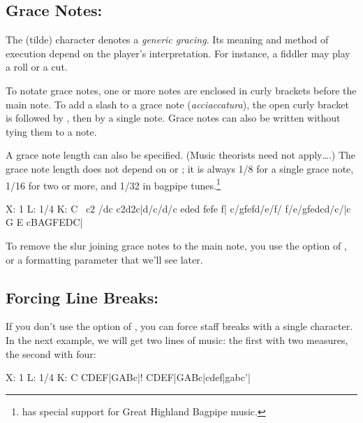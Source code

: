 \documentclass[a4paper,fullpage,12pt]{book}
\begin{document}

\subsection{Grace Notes: \icmd{\textasciitilde{} \{\}}}

The \car{\textasciitilde{}} (tilde) character denotes a \emph{generic
gracing}. Its meaning and method of execution depend on the player's
interpretation. For instance, a fiddler may play a roll or a cut.

To notate grace notes, one or more notes are enclosed in curly brackets
before the main note. To add a slash to a grace note
(\emph{acciaccatura}), the open curly bracket is followed by \car{/},
then by a single note. Grace notes can also be written without tying
them to a note.


A grace note length can also be specified. (Music theorists need not
apply{\ldots}.) The grace note length does not depend on  or
; it is always 1/8 for a single grace note, 1/16 for two or
more, and 1/32 in bagpipe tunes.\footnote{\abcm{} has special support
for Great Highland Bagpipe music.}


\begin{abcsource}
X: 1
L: 1/4
K: C
~c2 {/d}c {c2d2}c|{d/c/d/}c {ede}d {fef}e f|
c/{gfef}d/e/f/ f/e/{gfedc}d/c/|c G E {cBAGFED}C|
\end{abcsource}


To remove the slur joining grace notes to the main note, you use the
 option of \abcm, or a formatting parameter that we'll see
later.


\subsection{Forcing Line Breaks: \icmd{!}}

If you don't use the  option of \abcm, you can force staff
breaks with a single \car{!} character. In the next example, we will
get two lines of music: the first with two measures, the second with
four:

\begin{abcsource}
X: 1
L: 1/4
K: C
CDEF|GABc|! CDEF|GABc|cdef|gabc'|
\end{abcsource}
\end{document}
